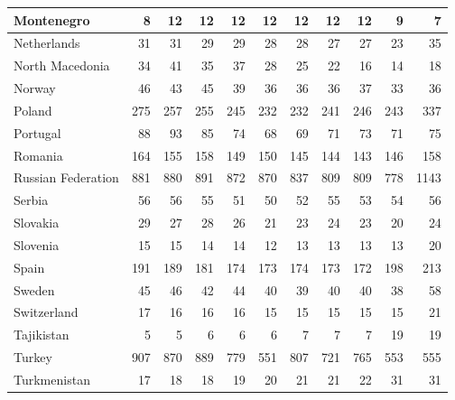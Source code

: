 \begin{table}
\begin{tabular}{|l|r|r|r|r|r|r|r|r|r|r|}
                    Montenegro&      8&     12&     12&     12&     12&     12&     12&     12&      9&      7\\\hline
                   Netherlands&     31&     31&     29&     29&     28&     28&     27&     27&     23&     35\\\hline
               North Macedonia&     34&     41&     35&     37&     28&     25&     22&     16&     14&     18\\\hline
                        Norway&     46&     43&     45&     39&     36&     36&     36&     37&     33&     36\\\hline
                        Poland&    275&    257&    255&    245&    232&    232&    241&    246&    243&    337\\\hline
                      Portugal&     88&     93&     85&     74&     68&     69&     71&     73&     71&     75\\\hline
                       Romania&    164&    155&    158&    149&    150&    145&    144&    143&    146&    158\\\hline
            Russian Federation&    881&    880&    891&    872&    870&    837&    809&    809&    778&   1143\\\hline
                        Serbia&     56&     56&     55&     51&     50&     52&     55&     53&     54&     56\\\hline
                      Slovakia&     29&     27&     28&     26&     21&     23&     24&     23&     20&     24\\\hline
                      Slovenia&     15&     15&     14&     14&     12&     13&     13&     13&     13&     20\\\hline
                         Spain&    191&    189&    181&    174&    173&    174&    173&    172&    198&    213\\\hline
                        Sweden&     45&     46&     42&     44&     40&     39&     40&     40&     38&     58\\\hline
                   Switzerland&     17&     16&     16&     16&     15&     15&     15&     15&     15&     21\\\hline
                    Tajikistan&      5&      5&      6&      6&      6&      7&      7&      7&     19&     19\\\hline
                        Turkey&    907&    870&    889&    779&    551&    807&    721&    765&    553&    555\\\hline
                  Turkmenistan&     17&     18&     18&     19&     20&     21&     21&     22&     31&     31\\\hline

\end{tabular}
\end{table}
